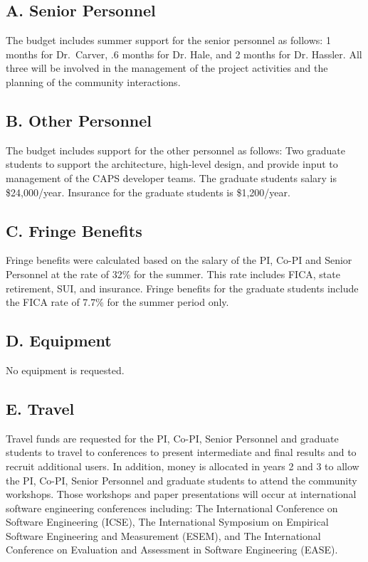 \subsection*{A. Senior Personnel}

The budget includes summer support for the senior personnel as follows: 1 months for Dr.\ Carver, .6 months for Dr. Hale, and 2 months for Dr. Hassler. All three will be involved in the management of the project activities and the planning of the community interactions.

\subsection*{B. Other Personnel}

The budget includes support for the other personnel as follows:
Two graduate students to support the architecture, high-level design, and provide input to management of the CAPS developer teams.
The graduate students salary is \$24,000/year.
Insurance for the graduate students is \$1,200/year.

\subsection*{C. Fringe Benefits}

Fringe benefits were calculated based on the salary of the PI, Co-PI and Senior Personnel at the rate of 32\% for the summer. This rate includes FICA, state retirement, SUI, and insurance. Fringe benefits for the graduate students include the FICA rate of 7.7\% for the summer period only. 

\subsection*{D. Equipment}
No equipment is requested.

\subsection*{E. Travel}

Travel funds are requested for the PI, Co-PI, Senior Personnel and graduate students to travel to conferences to present intermediate and final results and to recruit additional users.
In addition, money is allocated in years 2 and 3 to allow the PI, Co-PI, Senior Personnel and graduate students to attend the community workshops.
Those workshops and paper presentations will occur at international software engineering conferences including: The International Conference on Software Engineering (ICSE), The International Symposium on Empirical Software Engineering and Measurement (ESEM), and The International Conference on Evaluation and Assessment in Software Engineering (EASE).

